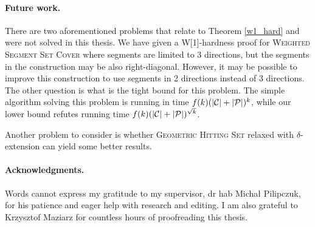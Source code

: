 \paragraph{Future work.} There are two aforementioned problems
that relate to Theorem \ref{w1_hard} and were not solved in this thesis.
We have given a W[1]-hardness proof
for \textsc{Weighted} \textsc{Segment} \textsc{Set} \textsc{Cover}
where segments are limited to 3 directions,
but the segments in the construction may be also right-diagonal.
However, it may be possible to improve this construction to use segments
in 2 directions instead of 3 directions. 
The other question is what is the tight bound for this problem.
The simple algorithm solving
this problem is running in time ${f(k)(|\mathcal{C}| + |\mathcal{P}|)^k}$,
while our lower bound refutes running time ${f(k)(|\mathcal{C}| + |\mathcal{P}|)^{\sqrt{k}}}$.

Another problem to consider is whether
\textsc{Geometric Hitting Set} relaxed with $\delta$-extension
can yield some better results.

\paragraph{Acknowledgments.} Words cannot express my gratitude
to my supervisor, dr hab Michał Pilipczuk, for his patience and eager help
with research and editing. I am also grateful to Krzysztof Maziarz
for countless hours of proofreading this thesis.

